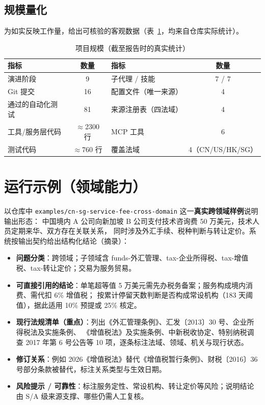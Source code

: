 \documentclass[a4paper,11pt]{ctexart}
\newcommand{\id}[1]{\texttt{#1}}
\begin{document}
\subsection{规模量化}
为如实反映工作量，给出可核验的客观数据（表~\ref{tab:metrics}，均来自仓库实际统计）。

\begin{table}[h]\centering\small
\caption{项目规模（截至报告时的真实统计）}\label{tab:metrics}
\begin{tabular}{lc@{\qquad}lc}
\toprule
\textbf{指标} & \textbf{数量} & \textbf{指标} & \textbf{数量} \\
\midrule
演进阶段 & 9 & 子代理 / 技能 & 7 / 7 \\
Git 提交 & 16 & 配置文件（唯一来源） & 4 \\
通过的自动化测试 & 81 & 来源注册表（四法域） & 4 \\
工具/服务层代码 & $\approx$2300 行 & MCP 工具 & 6 \\
测试代码 & $\approx$760 行 & 覆盖法域 & 4（CN/US/HK/SG）\\
\bottomrule
\end{tabular}
\end{table}

\section{运行示例（领域能力）}

以仓库中 \id{examples/cn-sg-service-fee-cross-domain} 这一\textbf{真实跨领域样例}说明输出形态：
中国境内 A 公司向新加坡 B 公司支付技术咨询费 50 万美元，技术人员定期来华、双方存在关联关系，
同时涉及外汇手续、税种判断与转让定价。系统按输出契约给出结构化结论（摘录）：

\begin{itemize}
\item \textbf{问题分类}：跨领域；子领域含 funds-外汇管理、tax-企业所得税、tax-增值税、tax-转让定价；交易为服务贸易。
\item \textbf{可直接引用的结论}：单笔超等值 5 万美元需先办税务备案；服务构成境内消费、需代扣 6\% 增值税；
按累计停留天数判断是否构成常设机构（183 天阈值），据此适用 10\% 预提或 25\% 核定。
\item \textbf{现行法规清单（重点）}：列出《外汇管理条例》、汇发〔2013〕30 号、企业所得税法及实施条例、
《增值税法》及实施条例、中新税收协定、特别纳税调查 2017 年第 6 号公告等 10 项，逐条标注法域、领域、机关与现行状态。
\item \textbf{修订关系}：例如 2026《增值税法》替代《增值税暂行条例》、财税〔2016〕36 号部分条款被替代，标注关系类型与生效日期。
\item \textbf{风险提示 / 可靠性}：标注服务定性、常设机构、转让定价等风险；说明结论由 S/A 级来源支撑、哪些仍需人工复核。
\end{itemize}
\end{document}

